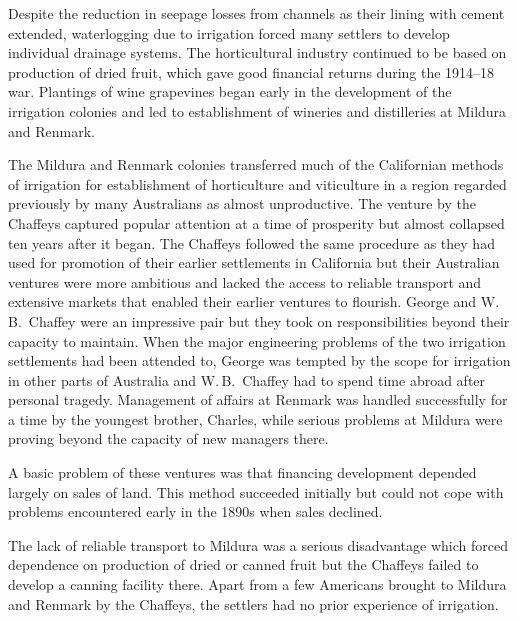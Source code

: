 Despite the reduction in seepage  losses from
channels as their lining with
cement extended, waterlogging due to irrigation forced many settlers
to develop individual drainage systems. 
The horticultural industry continued to be based on production of
dried fruit, which gave good
financial returns during the 1914--18 war.  Plantings
of wine grapevines began early in the development of
the irrigation colonies and led to establishment of wineries and
distilleries at Mildura and Renmark.

\closure
The Mildura and Renmark colonies transferred much of the
Californian methods of irrigation for establishment
of horticulture and viticulture in a region regarded previously by
many Australians as almost unproductive.  The venture by the Chaffeys
 captured popular attention at a time of
prosperity but almost collapsed ten years after it began.  The
Chaffeys followed the same procedure as they had used for promotion of
their earlier settlements in California but their Australian ventures
were more ambitious and lacked the access to reliable transport and
extensive markets that enabled their earlier ventures to flourish.
George and W.\,B.~Chaffey were an impressive pair but they took on
responsibilities beyond their capacity to maintain.  When the major
engineering problems of the two irrigation settlements had been
attended to, George was tempted by the scope for irrigation in other
parts of Australia and W.\,B.~Chaffey had to spend time abroad after
personal tragedy.  Management of affairs at Renmark was handled
successfully for a time by the youngest brother, Charles, while
serious problems at Mildura were proving beyond the capacity of new
managers there.

A basic problem of these ventures was that financing
development depend\-ed largely on sales of land.  This method
succeeded initially but could not cope with problems encountered early
in the 1890s when sales declined.

The lack of reliable transport to Mildura was a serious disadvantage
which forced dependence on production of dried or
canned fruit but the Chaffeys failed to develop a canning facility there.  Apart
from a few Americans brought to Mildura and Renmark
by the Chaffeys, the settlers had no prior experience of irrigation.

